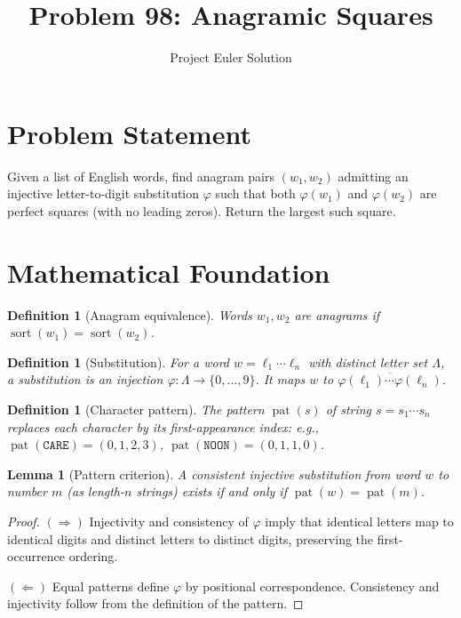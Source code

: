 \documentclass[12pt]{article}
\title{Problem 98: Anagramic Squares}
\author{Project Euler Solution}
\date{}
\newtheorem{lemma}[theorem]{Lemma}
\newtheorem{definition}[theorem]{Definition}
\begin{document}
\maketitle

\section{Problem Statement}
Given a list of English words, find anagram pairs $(w_1, w_2)$ admitting an injective letter-to-digit substitution $\varphi$ such that both $\varphi(w_1)$ and $\varphi(w_2)$ are perfect squares (with no leading zeros). Return the largest such square.

\section{Mathematical Foundation}

\begin{definition}[Anagram equivalence]
Words $w_1, w_2$ are anagrams if $\operatorname{sort}(w_1) = \operatorname{sort}(w_2)$.
\end{definition}

\begin{definition}[Substitution]
For a word $w = \ell_1 \cdots \ell_n$ with distinct letter set $\Lambda$, a \emph{substitution} is an injection $\varphi: \Lambda \to \{0,\ldots,9\}$. It maps $w$ to $\overline{\varphi(\ell_1)\cdots\varphi(\ell_n)}$.
\end{definition}

\begin{definition}[Character pattern]
The pattern $\operatorname{pat}(s)$ of string $s = s_1 \cdots s_n$ replaces each character by its first-appearance index: e.g., $\operatorname{pat}(\texttt{CARE}) = (0,1,2,3)$, $\operatorname{pat}(\texttt{NOON}) = (0,1,1,0)$.
\end{definition}

\begin{lemma}[Pattern criterion]
\label{lem:pat}
A consistent injective substitution from word $w$ to number $m$ (as length-$n$ strings) exists if and only if $\operatorname{pat}(w) = \operatorname{pat}(m)$.
\end{lemma}
\begin{proof}
$(\Rightarrow)$ Injectivity and consistency of $\varphi$ imply that identical letters map to identical digits and distinct letters to distinct digits, preserving the first-occurrence ordering.

$(\Leftarrow)$ Equal patterns define $\varphi$ by positional correspondence. Consistency and injectivity follow from the definition of the pattern.
\end{proof}
\end{document}

